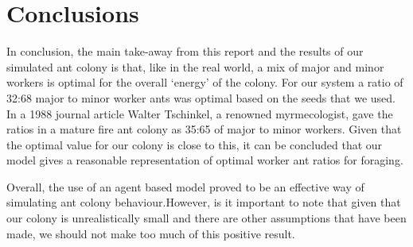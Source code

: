  \section{Conclusions}
In conclusion, the main take-away from this report and the results of our simulated ant colony is that, like in the real world, a mix of major and minor workers is optimal for the overall `energy' of the colony. For our system a ratio of 32:68 major to minor worker ants was optimal based on the seeds that we used. In a 1988 journal article \cite{Tschinkel1988} Walter Tschinkel, a renowned myrmecologist, gave the ratios in a mature fire ant colony as 35:65 of major to minor workers. Given that the optimal value for our colony is close to this, it can be concluded that our model gives a reasonable representation of optimal worker ant ratios for foraging.\par
Overall, the use of an agent based model proved to be an effective way of simulating ant colony behaviour.However, is it important to note that given that our colony is unrealistically small and there are other assumptions that have been made, we should not make too much of this positive result. 